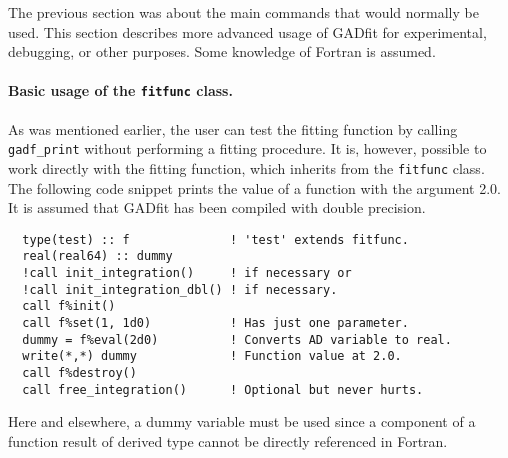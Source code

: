 \documentclass{article}
\begin{document}
The previous section was about the main commands that would normally
be used. This section describes more advanced usage of GADfit for
experimental, debugging, or other purposes. Some knowledge of Fortran
is assumed.

\paragraph{Basic usage of the \texttt{fitfunc} class.} As was
mentioned earlier, the user can test the fitting function by calling
\verb+gadf_print+ without performing a fitting procedure. It is,
however, possible to work directly with the fitting function, which
inherits from the \verb+fitfunc+ class. The following code snippet
prints the value of a function with the argument 2.0. It is assumed
that GADfit has been compiled with double precision.
\begin{verbatim}
  type(test) :: f              ! 'test' extends fitfunc.
  real(real64) :: dummy
  !call init_integration()     ! if necessary or
  !call init_integration_dbl() ! if necessary.
  call f%init()
  call f%set(1, 1d0)           ! Has just one parameter.
  dummy = f%eval(2d0)          ! Converts AD variable to real.
  write(*,*) dummy             ! Function value at 2.0.
  call f%destroy()
  call free_integration()      ! Optional but never hurts.
\end{verbatim}
Here and elsewhere, a dummy variable must be used since a component of
a function result of derived type cannot be directly referenced in
Fortran.
\end{document}
